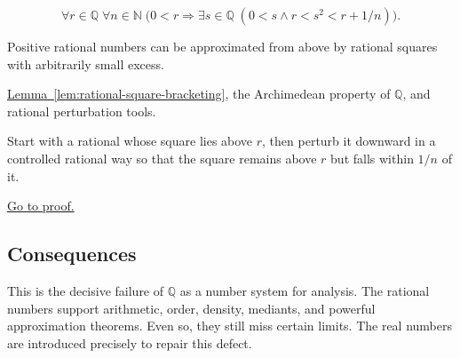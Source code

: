 \begin{remark*}
\[
\forall r\in\mathbb{Q}\;\forall n\in\mathbb{N}\;
\bigl(
0<r \Longrightarrow \exists s\in\mathbb{Q}\;(0<s \land r<s^2<r+1/n)
\bigr).
\]
\end{remark*}

\begin{remark*}[Interpretation]
Positive rational numbers can be approximated from above by rational squares
with arbitrarily small excess.
\end{remark*}

\begin{remark*}[Dependencies]
\hyperref[lem:rational-square-bracketing]{Lemma~\ref*{lem:rational-square-bracketing}},
the Archimedean property of $\mathbb{Q}$, and rational perturbation tools.
\end{remark*}

\begin{remark*}
Start with a rational whose square lies above $r$, then perturb it downward in
a controlled rational way so that the square remains above $r$ but falls within
$1/n$ of it.
\end{remark*}

\begin{remark*}[Proof]
\hyperref[prf:rational-square-approximation-from-above]{Go to proof.}
\end{remark*}

\subsection{Consequences}

\begin{remark}
This is the decisive failure of $\mathbb{Q}$ as a number system for analysis.  The rational numbers
support arithmetic, order, density, mediants, and powerful approximation theorems.  Even so, they
still miss certain limits.  The real numbers are introduced precisely to repair this defect.
\end{remark}
